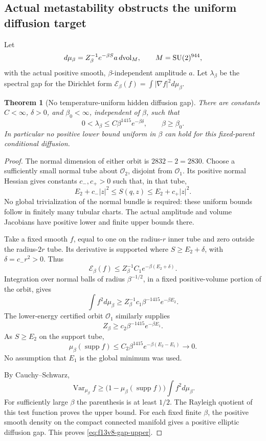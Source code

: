 \documentclass[11pt,oneside]{article}
\newtheorem{theorem}{Theorem}[section]
\DeclareMathOperator{\Var}{Var}
\DeclareMathOperator{\SU}{SU}
\newcommand{\E}{\mathcal E}
\begin{document}
\subsection{Actual metastability obstructs the uniform diffusion target}

Let
\[
 d\mu_\beta=Z_\beta^{-1}e^{-\beta S}a\,d{\rm vol}_M,
 \qquad M=\SU(2)^{944},
\]
with the actual positive smooth,
\(\beta\)-independent amplitude \(a\).
Let \(\lambda_\beta\) be the spectral
gap for the Dirichlet form
\(\E_\beta(f)=\int|\nabla f|^2d\mu_\beta\).

\begin{theorem}[No temperature-uniform hidden diffusion gap]
\label{thm:f13v8-metastability}
There are constants \(C<\infty\),
\(\delta>0\), and \(\beta_0<\infty\),
independent of \(\beta\), such that
\begin{equation}\label{eq:f13v8-gap-upper}
 0<\lambda_\beta\le
       C\beta^{1415}e^{-\beta\delta},
 \qquad\beta\ge\beta_0 .
\end{equation}
In particular no positive lower bound
uniform in \(\beta\) can hold for this
fixed-parent conditional diffusion.
\end{theorem}

\begin{proof}
The normal dimension of either orbit
is \(2832-2=2830\).
Choose a sufficiently small normal
tube about \(\mathcal O_2\), disjoint
from \(\mathcal O_1\). Its positive
normal Hessian gives constants
\(c_-,c_+>0\) such that, in that tube,
\[
 E_2+c_-|z|^2\le S(q,z)
                 \le E_2+c_+|z|^2 .
\]
No global trivialization of the normal
bundle is required: these uniform
bounds follow in finitely many tubular
charts. The actual amplitude and
volume Jacobians have positive lower
and finite upper bounds there.

Take a fixed smooth \(f\), equal to
one on the radius-\(r\) inner tube
and zero outside the radius-\(2r\)
tube. Its derivative is supported
where \(S\ge E_2+\delta\), with
\(\delta=c_-r^2>0\). Thus
\[
 \E_\beta(f)
 \le Z_\beta^{-1}C_1e^{-\beta(E_2+\delta)}.
\]
Integration over normal balls of
radius \(\beta^{-1/2}\), in a fixed
positive-volume portion of the orbit,
gives
\[
 \int f^2d\mu_\beta
 \ge Z_\beta^{-1}c_1\beta^{-1415}
                                e^{-\beta E_2}.
\]
The lower-energy certified orbit
\(\mathcal O_1\) similarly supplies
\[
 Z_\beta\ge c_2\beta^{-1415}
                             e^{-\beta E_1}.
\]
As \(S\ge E_2\) on the support tube,
\[
 \mu_\beta(\operatorname{supp}f)
 \le C_2\beta^{1415}
             e^{-\beta(E_2-E_1)}\longrightarrow0 .
\]
No assumption that \(E_1\) is the
global minimum was used.

By Cauchy--Schwarz,
\[
 \Var_{\mu_\beta}f
 \ge\bigl(1-\mu_\beta(\operatorname{supp}f)\bigr)
                         \int f^2d\mu_\beta .
\]
For sufficiently large \(\beta\) the
parenthesis is at least \(1/2\).
The Rayleigh quotient of this test
function proves the upper bound.
For each fixed finite \(\beta\), the
positive smooth density on the compact
connected manifold gives a positive
elliptic diffusion gap. This proves
\eqref{eq:f13v8-gap-upper}.
\end{proof}
\end{document}
